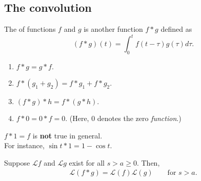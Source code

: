 \subsection{The convolution}
\begin{defn}[Convolution]
	The  of functions $f$ and $g$ is another function $f*g$ defined as
	\begin{equation*} 
		(f*g)(t) = \int_{0}^{t} f(t - \tau)g(\tau) d\tau.
	\end{equation*}
\end{defn}

\begin{mdframed}[style=boxstyle, frametitle={Properties}]
	\begin{enumerate}[leftmargin=*]
		\item $f*g = g*f.$
		\item $f*(g_1 + g_2) = f*g_1 + f*g_2.$
		\item $(f * g) * h = f * (g * h).$
		\item $f * 0 = 0 * f = 0.$ (Here, $0$ denotes the zero \emph{function}.)
	\end{enumerate}
\end{mdframed}

\begin{mdframed}[style=boxstyle, frametitle={Caution}]
	$f*1 = f$ is \textbf{not} true in general.\\
	For instance, $\sin t * 1 = 1 - \cos t.$
\end{mdframed}

\begin{thm}
	Suppose $\mathcal{L}f$ and $\mathcal{L}g$ exist for all $s > a \ge 0.$ Then,
	\begin{align*} 
		\mathcal{L}(f * g) = \mathcal{L}(f)\mathcal{L}(g) \qquad \text{for } s > a.
	\end{align*}
\end{thm}